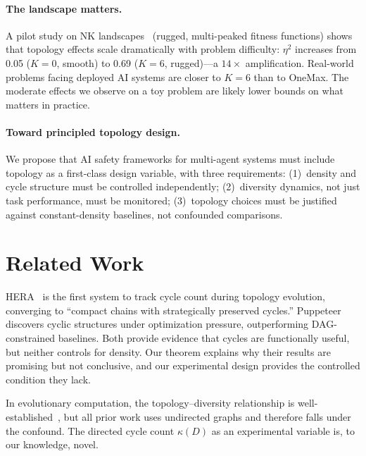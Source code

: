\documentclass[10pt,twocolumn]{article}
\begin{document}
\paragraph{The landscape matters.}
A pilot study on NK landscapes~\citep{kauffman1993origins} (rugged,
multi-peaked fitness functions) shows that topology effects scale
dramatically with problem difficulty: $\eta^2$ increases from 0.05
($K = 0$, smooth) to 0.69 ($K = 6$, rugged)---a $14\times$
amplification. Real-world problems facing deployed AI systems are
closer to $K = 6$ than to OneMax. The moderate effects we observe on
a toy problem are likely lower bounds on what matters in practice.

\paragraph{Toward principled topology design.}
We propose that AI safety frameworks for multi-agent systems must include
topology as a first-class design variable, with three requirements:
(1)~density and cycle structure must be controlled independently;
(2)~diversity dynamics, not just task performance, must be monitored;
(3)~topology choices must be justified against constant-density baselines,
not confounded comparisons.

\section{Related Work}
\label{sec:related}

HERA~\citep{hera2026} is the first system to track cycle count during
topology evolution, converging to ``compact chains with strategically
preserved cycles.'' Puppeteer~\citep{puppeteer2025} discovers cyclic
structures under optimization pressure, outperforming DAG-constrained
baselines. Both provide evidence that cycles are functionally useful, but
neither controls for density. Our theorem explains why their results are
promising but not conclusive, and our experimental design provides the
controlled condition they lack.

In evolutionary computation, the topology--diversity relationship is
well-established~\citep{tomassini2005spatially,skolicki2005influence}, but
all prior work uses undirected graphs and therefore falls under the
confound. The directed cycle count $\kappa(D)$ as an experimental variable
is, to our knowledge, novel.
\end{document}
